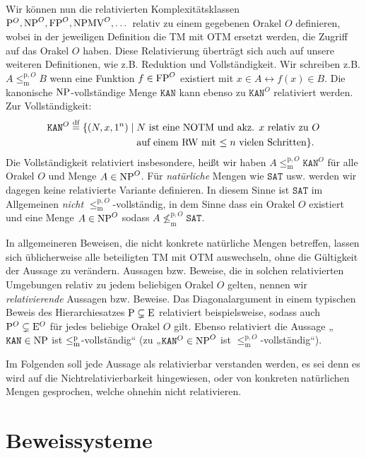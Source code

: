 Wir können nun die relativierten Komplexitätsklassen $\P^O, \NP^O, \FP^O, \NPMV^O, \dots$ relativ zu einem gegebenen Orakel $O$ definieren, wobei in der jeweiligen Definition die TM mit OTM ersetzt werden, die Zugriff auf das Orakel $O$ haben.
Diese Relativierung überträgt sich auch auf unsere weiteren Definitionen, wie z.B. Reduktion und Vollständigkeit. Wir schreiben z.B. $A\leq_\mathrm{m}^{\mathrm{p},O} B$ wenn eine Funktion $f\in\FP^O$ existiert mit $x\in A \leftrightarrow f(x)\in B$.
Die kanonische $\NP$-vollständige Menge $\mathtt{KAN}$ kann ebenso zu $\mathtt{KAN}^O$ relativiert werden. Zur Vollständigkeit:
\[ \begin{split} \mathtt{KAN}^O \defeq \{ (N, x, 1^n) \mid {}&\text{$N$ ist eine NOTM und akz. $x$ relativ zu $O$}\\&\text{auf einem RW mit $\leq n$ vielen Schritten} \}. \end{split} \]
Die Vollständigkeit relativiert insbesondere, heißt wir haben $A\leq_\mathrm{m}^{\mathrm{p},O}\mathtt{KAN}^O$ für alle Orakel $O$ und Menge $A\in\NP^O$.
Für \emph{natürliche} Mengen wie $\mathtt{SAT}$ usw. werden wir dagegen keine relativierte Variante definieren. In diesem Sinne ist $\mathtt{SAT}$ im Allgemeinen \emph{nicht} $\leq_\mathrm{m}^{\mathrm{p},O}$-vollständig, in dem Sinne dass ein Orakel $O$ existiert und eine Menge $A\in\NP^O$ sodass $A\not\leq_\mathrm{m}^{\mathrm{p},O} \mathtt{SAT}$.

In allgemeineren Beweisen, die nicht konkrete natürliche Mengen betreffen, lassen sich üblicherweise alle beteiligten TM mit OTM auswechseln, ohne die Gültigkeit der Aussage zu verändern.
Aussagen bzw. Beweise, die in solchen relativierten Umgebungen relativ zu jedem beliebigen Orakel $O$ gelten, nennen wir \emph{relativierende} Aussagen bzw. Beweise.
Das Diagonalargument in einem typischen Beweis des Hierarchiesatzes $\P\subsetneq\mathrm{E}$ relativiert beispielsweise, sodass auch $\P^O\subsetneq\mathrm{E}^O$ für jedes beliebige Orakel $O$ gilt. 
Ebenso relativiert die Aussage „$\mathtt{KAN}\in\NP$ ist $\leqmp$-vollständig“ (zu „$\mathtt{KAN}^O\in\NP^O$ ist $\leq_\mathrm{m}^{\mathrm{p},O}$-vollständig“).

Im Folgenden soll jede Aussage als relativierbar verstanden werden, es sei denn es wird auf die Nichtrelativierbarkeit hingewiesen, oder von konkreten natürlichen Mengen gesprochen, welche ohnehin nicht relativieren.


\section{Beweissysteme}\label{sec:prelim-ps}

